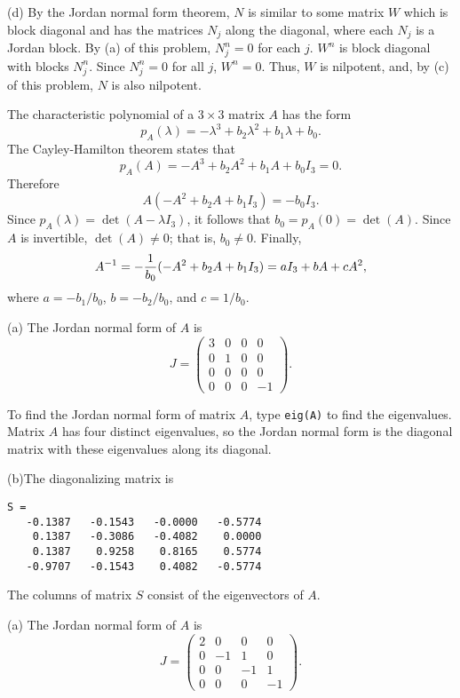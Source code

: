 \documentclass{ximera}
\begin{document}
(d) By the Jordan normal form theorem, $N$ is similar to some matrix $W$ which
is block diagonal and has the matrices $N_j$ along the diagonal, where each
$N_j$ is a Jordan block.  By (a) of this problem, $N_j^n = 0$ for each
$j$.  $W^n$ is block diagonal with blocks $N_j^n$.  Since $N_j^n = 0$ for all
$j$, $W^n = 0$.  Thus, $W$ is nilpotent, and, by (c) of this problem, $N$
is also nilpotent.

The characteristic polynomial of a $3\times 3$ matrix $A$ has the form 
\[
p_A(\lambda) = -\lambda^3 + b_2\lambda^2 + b_1\lambda + b_0.
\]
The Cayley-Hamilton theorem states that 
\[
p_A(A) = -A^3 + b_2A^2 + b_1A + b_0I_3 = 0.
\]
Therefore
\[
A(-A^2 +b_2A +b_1I_3) = -b_0I_3.
\]
Since $p_A(\lambda) =\det(A-\lambda I_3)$, it follows that $b_0=p_A(0)=\det(A)$.
Since $A$ is invertible, $\det(A)\neq 0$; that is, $b_0\neq 0$.  Finally, 
\[
A^{-1} = -\frac{1}{b_0}(-A^2+b_2A+b_1I_3) = aI_3 + bA + cA^2,
\]
where $a = -b_1/b_0$, $b = -b_2/b_0$, and $c=1/b_0$.



(a) \ans The Jordan normal form of $A$ is
\[
J = \left(\begin{array}{rrrr}
3 & 0 & 0 & 0 \\
0 & 1 & 0 & 0 \\
0 & 0 & 0 & 0 \\
0 & 0 & 0 & -1 \end{array}\right).
\]

\soln
To find the Jordan normal form of matrix $A$, type {\tt eig(A)} to find
the eigenvalues.  Matrix $A$ has four distinct eigenvalues, so the
Jordan normal form is the diagonal matrix with these eigenvalues along
its diagonal.  

(b)\ans   The diagonalizing matrix is
\begin{verbatim}
S =
   -0.1387   -0.1543   -0.0000   -0.5774
    0.1387   -0.3086   -0.4082    0.0000
    0.1387    0.9258    0.8165    0.5774
   -0.9707   -0.1543    0.4082   -0.5774
\end{verbatim}

\soln The columns of matrix $S$ consist of the eigenvectors of $A$.


(a) \ans The Jordan normal form of $A$ is
\[
J = \left(\begin{array}{rrrr}
2 & 0 & 0 & 0 \\
0 & -1 & 1 & 0 \\
0 & 0 & -1 & 1 \\
0 & 0 & 0 & -1 \end{array}\right).
\]
\end{document}
